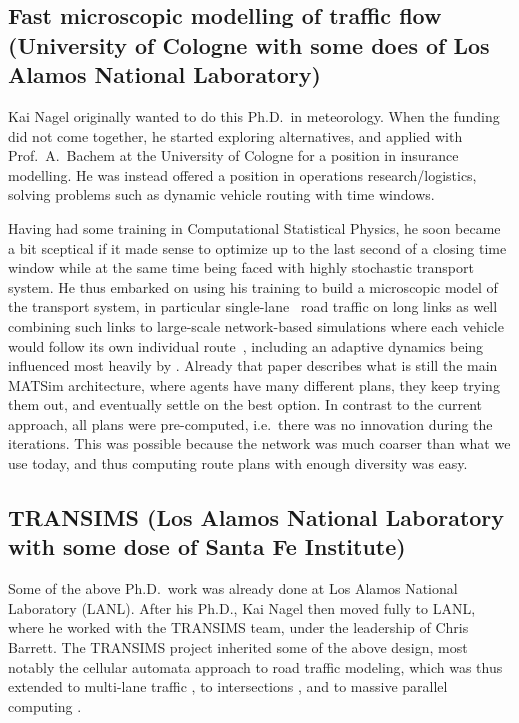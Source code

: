 
\subsection{Fast microscopic modelling of traffic flow (University of Cologne with some does of Los Alamos National Laboratory)}
\label{sec:history-u-of-cologne-phase}

Kai Nagel originally wanted to do this Ph.D.\ in meteorology.  When the funding did not come together, he started exploring alternatives, and applied with Prof.\ A.\ Bachem at the University of Cologne for a position in insurance modelling.  He was instead offered a position in operations research/logistics, solving problems such as dynamic vehicle routing with time windows. 

Having had some training in Computational Statistical Physics, he soon became a bit sceptical if it made sense to optimize up to the last second of a closing time window while at the same time being faced with highly stochastic transport system.  He thus embarked on using his training to build a microscopic model of the transport system, in particular single-lane~\citep{NagelSchreckenberg1992CA,Nagel1999flowTheoTrr} road traffic on long links as well combining such links to large-scale network-based simulations where each vehicle would follow its own individual route~\citep{Nagel1996NRW}, including an adaptive dynamics being influenced most heavily by \cite{ArthurBar}.  Already that paper describes what is still the main MATSim architecture, where agents have many different plans, they keep trying them out, and eventually settle on the best option.  In contrast to the current approach, all plans were pre-computed, i.e.\ there was no innovation during the iterations.  This was possible because the network was much coarser than what we use today, and thus computing route plans with enough diversity was easy.

\subsection{TRANSIMS (Los Alamos National Laboratory with some dose of Santa Fe Institute)}
\label{sec:history-lanl-phase}

Some of the above Ph.D.\ work was already done at Los Alamos National Laboratory (LANL).  After his Ph.D., Kai Nagel then moved fully to LANL, where he worked with the TRANSIMS \citep[TRansportation ANalysis and SIMulation System, e.g.][]{SmithEtc1995TRANSIMSSeattle} team, under the leadership of Chris Barrett.
%
The TRANSIMS project inherited some of the above design, most notably the cellular automata approach to road traffic modeling, which was thus extended to multi-lane traffic \citep{NagelWolfEtAl1998TwoLaneSystematic}, to intersections \citep{NagelEtc1997flow-char}, and to massive parallel computing \citep{NagelRickert2001parallel}.

